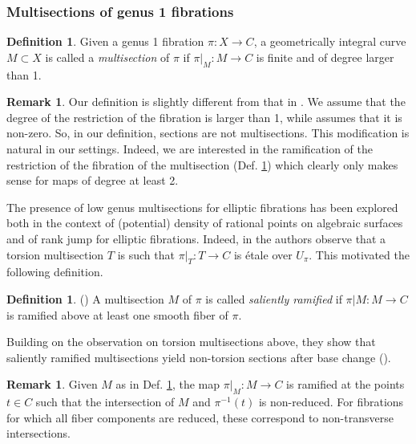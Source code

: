 \documentclass{amsart}
\theoremstyle{definition}
\newtheorem{definition}[theorem]{Definition}
\newtheorem{remark}[theorem]{Remark}
\numberwithin{equation}{section}
\begin{document}
\subsubsection{Multisections of genus 1 fibrations}
\begin{definition}
Given a  genus 1 fibration $\pi: X \rightarrow C$, a geometrically integral curve $M \subset X$ is called a \textit{multisection} of $\pi$ if $\pi|_{M}: M \rightarrow C$ is finite and of degree larger than 1.
\end{definition}

\begin{remark}
    Our definition is slightly different from that in \cite[Def. 3.2.]{BT}. We assume that the degree of the restriction of the fibration is larger than 1, while \cite{BT} assumes that it is non-zero. So, in our definition, sections are not multisections. This modification is natural in our settings. Indeed, we are interested in the ramification of the restriction of the fibration of the multisection (Def. \ref{def:salient}) which clearly only makes sense for maps of degree at least 2.
\end{remark}


The presence of low genus multisections for elliptic fibrations has been explored both in the context of (potential) density of rational points on algebraic surfaces and of rank jump for elliptic fibrations. Indeed, in \cite{BT2000} the authors observe that a torsion multisection $T$ is such that $\pi|_T: T \rightarrow C$ is \'etale over $U_\pi$. This motivated the following definition.

\begin{definition}\label{def:salient}(\cite[Definition 2.3]{BT2000})
A multisection $M$ of $\pi$ is called \textit{saliently ramified} if $\pi|M: M \rightarrow C$ is ramified above at least one smooth fiber of $\pi$. 
\end{definition}
Building on the observation on torsion multisections above, they show that saliently ramified multisections yield non-torsion sections after base change (\cite[Prop. 2.10]{BT2000}). 


\begin{remark}\label{rem:salient}
Given $M$ as in Def. \ref{def:salient}, the map $\pi|_M: M \rightarrow C$ is ramified at the points $t\in C$ such that the intersection of $M$ and $\pi^{-1}(t)$ is non-reduced. For fibrations for which all fiber components are reduced, these correspond to non-transverse intersections.
\end{remark}
\end{document}
